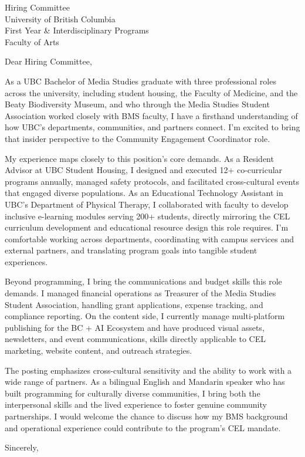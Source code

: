 \documentclass[11pt,a4paper]{letter}
\begin{document}
\begin{letter}{Hiring Committee \\ University of British Columbia \\ First Year \& Interdisciplinary Programs \\ Faculty of Arts}

\opening{Dear Hiring Committee,}

As a UBC Bachelor of Media Studies graduate with three professional roles across the university, including student housing, the Faculty of Medicine, and the Beaty Biodiversity Museum, and who through the Media Studies Student Association worked closely with BMS faculty, I have a firsthand understanding of how UBC's departments, communities, and partners connect. I'm excited to bring that insider perspective to the Community Engagement Coordinator role.

My experience maps closely to this position's core demands. As a Resident Advisor at UBC Student Housing, I designed and executed 12+ co-curricular programs annually, managed safety protocols, and facilitated cross-cultural events that engaged diverse populations. As an Educational Technology Assistant in UBC's Department of Physical Therapy, I collaborated with faculty to develop inclusive e-learning modules serving 200+ students, directly mirroring the CEL curriculum development and educational resource design this role requires. I'm comfortable working across departments, coordinating with campus services and external partners, and translating program goals into tangible student experiences.

Beyond programming, I bring the communications and budget skills this role demands. I managed financial operations as Treasurer of the Media Studies Student Association, handling grant applications, expense tracking, and compliance reporting. On the content side, I currently manage multi-platform publishing for the BC + AI Ecosystem and have produced visual assets, newsletters, and event communications, skills directly applicable to CEL marketing, website content, and outreach strategies.

The posting emphasizes cross-cultural sensitivity and the ability to work with a wide range of partners. As a bilingual English and Mandarin speaker who has built programming for culturally diverse communities, I bring both the interpersonal skills and the lived experience to foster genuine community partnerships. I would welcome the chance to discuss how my BMS background and operational experience could contribute to the program's CEL mandate.

\closing{Sincerely,}

\end{letter}
\end{document}
